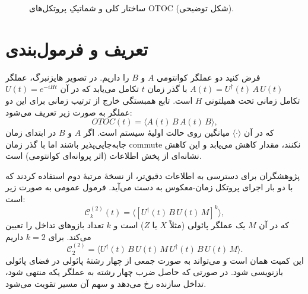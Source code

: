\begin{figure}[htbp]
  \centering
  \caption{ساختار کلی و شماتیکِ پروتکل‌های OTOC (شکل توضیحی). }
  \label{fig:otoc-protocol}
\end{figure}

\section{تعریف و فرمول‌بندی }

فرض کنید دو عملگر کوانتومی \(A\) و \(B\) را داریم. در تصویر هایزنبرگ، عملگر \(A(t)=U^{\dagger}(t)\,A\,U(t)\) با گذر زمان \(t\) تکامل می‌یابد که در آن \(U(t)=e^{-iHt}\) تکامل زمانی تحت همیلتونی \(H\) است. تابع همبستگی خارج از ترتیب زمانی  برای این دو عملگر به صورت زیر تعریف می‌شود:
\begin{equation}
  OTOC(t)=\langle A(t)\,B\,A(t)\,B\rangle,
\end{equation}
که در آن \(\langle\cdot\rangle\) میانگین روی حالت اولیهٔ سیستم است. اگر \(A\) و \(B\) در ابتدای زمان جابه‌جایی‌پذیر باشند اما با گذر زمان commute نکنند، مقدار  کاهش می‌یابد و این کاهش نشانه‌ای از پخش اطلاعات (اثر پروانه‌ای کوانتومی) است.

پژوهشگران برای دسترسی به اطلاعات دقیق‌تر، از نسخهٔ مرتبهٔ دوم  استفاده کردند که با دو بار اجرای پروتکل زمان-معکوس به دست می‌آید. فرمول عمومی  به صورت زیر است:
\begin{equation}
  \mathcal{C}_k^{(2)}(t)=\bigl\langle \left[ U^{\dagger}(t)\,B\,U(t)\,M\right]^k \bigr\rangle,
\end{equation}
که در آن \(M\) یک عملگر پائولی (مثلاً \(X\) یا \(Z\)) است و \(k\) تعداد بازوهای تداخل را تعیین می‌کند. برای \(k=2\) داریم
\begin{equation}
  \mathcal{C}_2^{(2)}=\langle U^{\dagger}(t)\,B\,U(t)\,M\,U^{\dagger}(t)\,B\,U(t)\,M\rangle.
\end{equation}
این کمیت همان  است و می‌تواند به صورت جمعی از چهار رشتهٔ پائولی در فضای پائولی بازنویسی شود. در صورتی که حاصل ضرب چهار رشته به عملگر یکه منتهی شود، تداخل سازنده رخ می‌دهد و سهم آن مسیر تقویت می‌شود.

